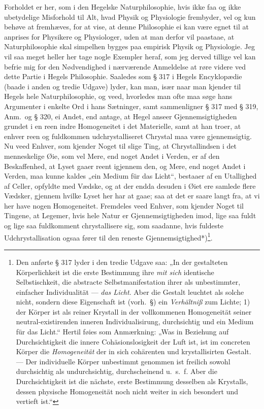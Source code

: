 \documentclass[12pt,a4paper]{book}
\newcommand{\apage}[1]{\marginnote{\footnotesize\textit{[#1]}}}
\begin{document}
Forholdet er her, som i den Hegelske Naturphilosophie, hvis ikke faa og ikke
ubetydelige Misforhold til Alt, hvad Physik og Physiologie frembyder, vel og
kun behøve at fremhæves, for at vise, at denne Philosophie ei kan være egnet
til at anprises for Physikere og Physiologer, uden at man derfor vil
paastaae, at Naturphilosophie skal simpelhen bygges paa empirisk Physik og
Physiologie. Jeg vil saa meget heller her tage nogle Exempler heraf, som jeg
derved tillige vel kan befrie mig for den Nødvendighed i nærværende
Anmeldelse at røre videre ved dette Partie i Hegels Philosophie. Saaledes
som § 317 i Hegels Encyklopædie (baade i anden og tredie Udgave) lyder, kan
man, især naar man kjender til Hegels hele Naturphilosophie, og veed,
hvorledes man ofte maa søge hans Argumenter i enkelte Ord i hans Sætninger,
samt sammenligner § 317 med § 319, Anm.\ og § 320, ei Andet, end antage, at
Hegel anseer Gjennemsigtigheden grundet i en reen indre Homogeneitet i det
Materielle, samt at han troer, at enhver reen og fuldkommen udchrystalliseret
Chrystal maa være gjennemsigtig. Nu veed Enhver, som kjender Noget til slige
Ting, at Chrystallindsen i det menneskelige Øie, som vel Mere, end noget
Andet i Verden, er af den Beskaffenhed, at Lyset gaaer reent igjennem den,
og Mere, end noget Andet i Verden, maa kunne kaldes „ein Medium für das
Licht“, bestaaer af en Utallighed af Celler, opfyldte med Vædske, og at der
endda desuden i Øiet ere samlede flere Vædsker, gjennem hvilke Lyset her har
at gaae; saa at det er saare langt fra, at vi her have nogen \apage{22} Homogeneitet.
Fremdeles veed Enhver, som kjender Noget til Tingene, at Legemer, hvis hele
Natur er Gjennemsigtigheden imod, lige saa fuldt og lige saa fuldkomment
chrystallisere sig, som saadanne, hvis fuldeste Udchrystallisation ogsaa
fører til den reneste Gjennemsigtighed*)\footnote{Den anførte § 317 lyder i
den tredie Udgave saa: „In der gestalteten Körperlichkeit ist die
erste Bestimmung ihre \emph{mit sich} identische Selbstischkeit, die abstracte
Selbstmanifestation ihrer als unbestimmter, einfacher Individualität ---
\emph{das Licht}. Aber die Gestalt leuchtet als solche nicht, sondern diese
Eigenschaft ist (vorh.\ §) ein \emph{Verhältniß} zum Lichte; 1) der Körper ist als
reiner Krystall in der vollkommenen Homogeneität seiner neutral-existirenden
inneren Individualisirung, durchsichtig und ein Medium für das Licht.“
Hertil føies som Anmærkning: „Was in Beziehung auf Durchsichtigkeit
die innere Cohäsionslosigkeit der Luft ist, ist im concreten Körper die
\emph{Homogeneität} der in sich cohärenten und krystallisirten Gestalt. --- Der
individuelle Körper unbestimmt genommen ist freilich sowohl durchsichtig als
undurchsichtig, durchscheinend u.\ s.\ f. Aber die Durchsichtigkeit ist die
nächste, erste Bestimmung desselben als Krystalls, dessen physische
Homogeneität noch nicht weiter in sich besondert und vertieft ist.“}.
\end{document}
